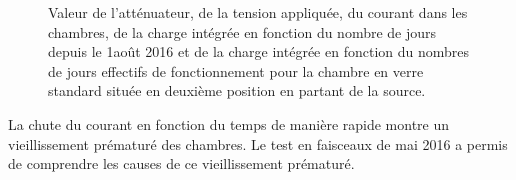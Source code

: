 \begin{figure}[!ht]
	\caption{Valeur de l'atténuateur, de la tension appliquée, du courant dans les chambres, de la charge intégrée en fonction du nombre de jours depuis le 1\ier août \num{2016}  et de la charge intégrée en fonction du nombres de jours effectifs de fonctionnement pour la chambre en verre standard située en deuxième position en partant de la source.}
	\label{CourantHR}
\end{figure}

La chute du courant en fonction du temps de manière rapide montre un vieillissement prématuré des chambres. Le test en faisceaux de mai 2016 a permis de comprendre les causes de ce vieillissement prématuré.

